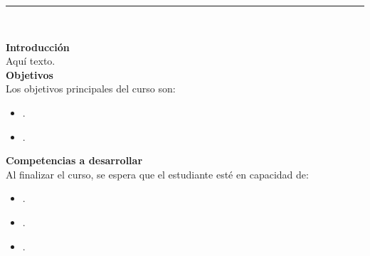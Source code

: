 \documentclass[letterpaper,10pt,onecolumn]{article}
\begin{document}



\noindent\rule{\textwidth}{1pt}\\[-0.1cm]

\addtocounter{mysection}{1}

\noindent\textbf{\large {} \quad Introducci\'on}\\[-0.2cm]


\noindent\normalsize Aqu\'i texto.\\[0.1cm]

\noindent\textbf{\large {} \quad Objetivos}\\[-0.2cm]


\noindent\normalsize Los objetivos principales del curso son:

\begin{itemize}
	\item .\\[-0.6cm]
	\item .\\[-0.2cm]
\end{itemize}

\noindent\textbf{\large {} \quad Competencias a desarrollar}\\[-0.2cm]


\noindent\normalsize Al finalizar el curso, se espera que el estudiante est\'e en capacidad de:

\begin{itemize}
	\item .\\[-0.6cm]
	\item .\\[-0.6cm]
	\item .\\[-0.2cm]
\end{itemize}
\end{document}
